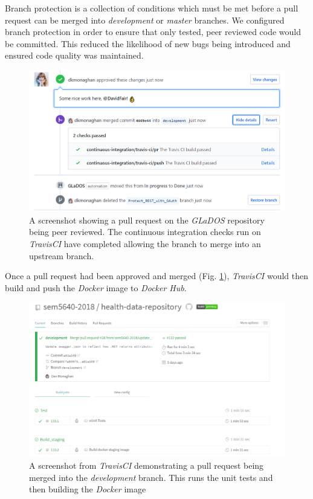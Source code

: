 \par
Branch protection is a collection of conditions which must be met before a pull request can be merged into \textit{development} or \textit{master} branches. We configured branch protection in order to ensure that only tested, peer reviewed code would be committed. This reduced the likelihood of new bugs being introduced and ensured code quality was maintained.

\begin{figure}[H]
    \centering
    \includegraphics[width=\textwidth]{Images/approve_pr.png}
    \caption{A screenshot showing a pull request on the \textit{GLaDOS} repository being peer reviewed. The continuous integration checks run on \textit{TravisCI} have completed allowing the branch to merge into an upstream branch.}
    \label{fig:approve_pull_request}
\end{figure}

\par
Once a pull request had been approved and merged (Fig. \ref{fig:approve_pull_request}), \textit{TravisCI} would then build and push the \textit{Docker} image to \textit{Docker Hub}.

\begin{figure}[H]
    \centering
    \includegraphics[width=\textwidth]{Images/travis_builds_overview.png}
    \caption{A screenshot from \textit{TravisCI} demonstrating a pull request being merged into the \textit{development} branch. This runs the unit tests and then building the \textit{Docker} image}
    \label{fig:travis_ui}
\end{figure}

